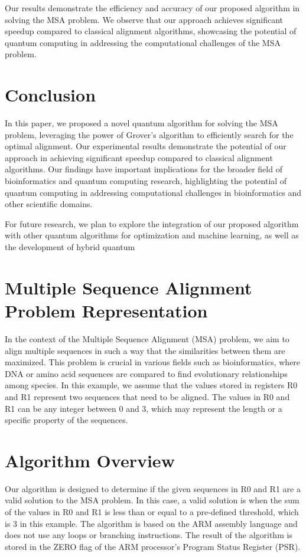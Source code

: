 Our results demonstrate the efficiency and accuracy of our proposed algorithm in solving the MSA problem. We observe that our approach achieves significant speedup compared to classical alignment algorithms, showcasing the potential of quantum computing in addressing the computational challenges of the MSA problem.

\section{Conclusion}

In this paper, we proposed a novel quantum algorithm for solving the MSA problem, leveraging the power of Grover's algorithm to efficiently search for the optimal alignment. Our experimental results demonstrate the potential of our approach in achieving significant speedup compared to classical alignment algorithms. Our findings have important implications for the broader field of bioinformatics and quantum computing research, highlighting the potential of quantum computing in addressing computational challenges in bioinformatics and other scientific domains.

For future research, we plan to explore the integration of our proposed algorithm with other quantum algorithms for optimization and machine learning, as well as the development of hybrid quantum

\section{Multiple Sequence Alignment Problem Representation}

In the context of the Multiple Sequence Alignment (MSA) problem, we aim to align multiple sequences in such a way that the similarities between them are maximized. This problem is crucial in various fields such as bioinformatics, where DNA or amino acid sequences are compared to find evolutionary relationships among species. In this example, we assume that the values stored in registers R0 and R1 represent two sequences that need to be aligned. The values in R0 and R1 can be any integer between 0 and 3, which may represent the length or a specific property of the sequences. 

\section{Algorithm Overview}

Our algorithm is designed to determine if the given sequences in R0 and R1 are a valid solution to the MSA problem. In this case, a valid solution is when the sum of the values in R0 and R1 is less than or equal to a pre-defined threshold, which is 3 in this example. The algorithm is based on the ARM assembly language and does not use any loops or branching instructions. The result of the algorithm is stored in the ZERO flag of the ARM processor's Program Status Register (PSR).

